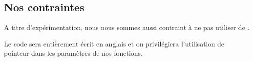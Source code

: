 
\subsection{Nos contraintes}
\label{nomalloc}

A titre d'expérimentation, nous nous sommes aussi contraint à ne pas utiliser de .

Le code sera entièrement écrit en anglais et on privilégiera l'utilisation de pointeur dans les paramètres de nos fonctions. 
